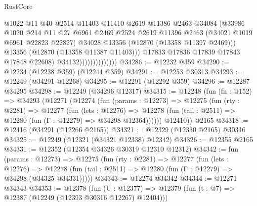 \begin{lexlean}{RustCore}
\begin{coremodule}
                                    @1022
                                    @11
                                    @40
                                    @2514
                                    @11403
                                    @11410
                                    @2619
                                    @11386
                                    @2463
                                    @34084
                                    (@33986
                                      @1020
                                      @214
                                      @11
                                      @27
                                      @6961
                                      @2469
                                      @2524
                                      @2619
                                      @11396
                                      @2463
                                      (@34021 @1019 @6961 @22823 @22827)
                                      @34028
                                      @13356
                                      (@12870 (@13358 @11397 @2469)))
                                    @13356
                                    (@12870 (@13358 @11387 @11403)))
                                  @17833
                                  @17836
                                  @17839
                                  @17843
                                  @17848
                                  @22608)
                                @34132))))))))))))))
@34286 := @12232 @359
@34290 := @12234 (@12238 @359) (@12244 @359)
@34291 := @12253 @30313
@34293 := @12249 (@34291 @12268)
@34295 := @12291 (@12292 @359)
@34296 := @12287 @34295
@34298 := @12249 (@34296 @12317)
@34315 := @12248
    (fun (fn : @152) =>
    @34293
      (@12271
        (@12274
          (fun (params : @12273) =>
          @12275
            (fun (rty : @2281) =>
            @12277
              (fun (lets : @12276) =>
              @12278 (fun (tail : @2511) => @12280 (fun (Γ : @12279) => @34298 @12364))))))
        @12410))
    @2165
@34318 := @12416 (@34291 (@12266 @2165))
@34321 := @12329 (@12330 @2165) @30316
@34325 := @12249 (@12321 (@34321 @12338) @12342)
@34326 := @12355 @2165
@34331 := @12352 (@12354 @34326 @30319 @12310 @12312)
@34342 := fun (params : @12273) =>
  @12275
    (fun (rty : @2281) =>
    @12277
      (fun (lets : @12276) =>
      @12278 (fun (tail : @2511) => @12280 (fun (Γ : @12279) => @34298 (@34325 @34331)))))
@34343 := @12274 @34342
@34344 := @12271 @34343
@34353 := @12378
    (fun (U : @12377) => @12379 (fun (t : @7) => @12387 (@12249 (@12393 @30316 @12267) @12404)))

\end{coremodule}
\end{lexlean}
